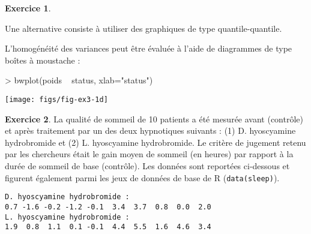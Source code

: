 \documentclass[11pt]{report}
\makeatletter
\theoremstyle{definition}
\newtheorem{exo}{Exercice}[chapter]
\newcommand{\foo}[1]{\texttt{#1}}
\newcommand{\cmd}[1]{\index{#1@\foo{#1}}}
\makeatother
\begin{document}
\begin{exo}
\begin{sol}
Une alternative consiste à utiliser des graphiques de type quantile-quantile.

L'homogénéité des variances peut être évaluée à l'aide de diagrammes de type
boîtes à moustache :
\begin{Schunk}
\begin{Sinput}
> bwplot(poids ~ status, xlab="status")
\end{Sinput}
\end{Schunk}
\texttt{[image: figs/fig-ex3-1d]}
\cmd{bwplot}
\end{sol}
\end{exo}
%
%
\begin{exo}\label{exo:3.2}
La qualité de sommeil de 10 patients a été mesurée avant (contrôle) et après
traitement par un des deux hypnotiques suivants : (1) D. hyoscyamine
hydrobromide et (2) L. hyoscyamine hydrobromide. Le critère de jugement
retenu par les chercheurs était le gain moyen de sommeil (en heures) par
rapport à la durée de sommeil de base
(contrôle). \autocite[p.~20]{student08} Les données sont reportées
ci-dessous et figurent également parmi les jeux de données de base de R
(\verb|data(sleep)|).  
\begin{verbatim}
D. hyoscyamine hydrobromide :
0.7 -1.6 -0.2 -1.2 -0.1  3.4  3.7  0.8  0.0  2.0
L. hyoscyamine hydrobromide :
1.9  0.8  1.1  0.1 -0.1  4.4  5.5  1.6  4.6  3.4
\end{verbatim}


\end{exo}
\end{document}
